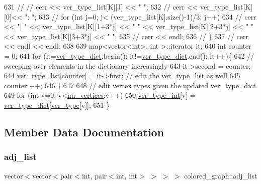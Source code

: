 \begin{DoxyCode}
631   \textcolor{comment}{//   //  cerr << ver\_type\_list[K][J] << " ";}
632   \textcolor{comment}{//   cerr << ver\_type\_list[K][0]<< ": ";}
633   \textcolor{comment}{//   for (int j=0; j< (ver\_type\_list[K].size()-1)/3; j++)}
634   \textcolor{comment}{//     cerr << "| " << ver\_type\_list[K][1+3*j] << " " << ver\_type\_list[K][2+3*j] << " " <<
       ver\_type\_list[K][3+3*j] << " ";}
635   \textcolor{comment}{//   cerr << endl;}
636   \textcolor{comment}{// \}}
637   \textcolor{comment}{// cerr << endl << endl;}
638 
639   map<vector<int>, \textcolor{keywordtype}{int} >::iterator it;
640   \textcolor{keywordtype}{int} counter = 0;
641   \textcolor{keywordflow}{for} (it=\hyperlink{classcolored__graph_aeb780762429ddac375799f4a45405712}{ver\_type\_dict}.begin(); it!=\hyperlink{classcolored__graph_aeb780762429ddac375799f4a45405712}{ver\_type\_dict}.end(); it++)\{
642     \textcolor{comment}{// sweeping over elements in the dictionary increasingly }
643     it->second = counter; 
644     \hyperlink{classcolored__graph_a3a1ae8abac458d20a2afb4aa48bbc956}{ver\_type\_list}[counter] = it->first; \textcolor{comment}{// edit the ver\_type\_list as well}
645     counter ++;
646   \}
647 
648   \textcolor{comment}{// edit vertex types given the updated ver\_type\_dict}
649   \textcolor{keywordflow}{for} (\textcolor{keywordtype}{int} v=0; v<\hyperlink{classcolored__graph_a90ece8eb1fec52f3f41549ab527c1d5b}{nu\_vertices};v++)
650     \hyperlink{classcolored__graph_a491ed2ea1a65118af02ec606c8d44c0a}{ver\_type\_int}[v] = \hyperlink{classcolored__graph_aeb780762429ddac375799f4a45405712}{ver\_type\_dict}[\hyperlink{classcolored__graph_a2cc32e7146fa3319f83cfa940f5e1be4}{ver\_type}[v]]; 
651 \}
\end{DoxyCode}


\subsection{Member Data Documentation}
\mbox{\label{classcolored__graph_a45dce16965079286cf3f41a54a1b2ea4}} 
\subsubsection{\texorpdfstring{adj\+\_\+list}{adj\_list}}
{\footnotesize\ttfamily vector$<$vector$<$pair$<$int, pair$<$int, int$>$ $>$ $>$ $>$ colored\+\_\+graph\+::adj\+\_\+list}



